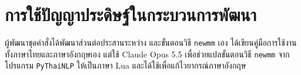 \chapter{การใช้ปัญญาประดิษฐ์ในกระบวนการพัฒนา}

ผู้พัฒนาชุดคำสั่งได้พัฒนาส่วนต่อประสานระหว่าง \lualatexlogo และขั้นตอนวิธี
\texttt{newmm} เอง ได้เขียนคู่มือการใช้งานทั้งภาษาไทยและภาษาอังกฤษเอง แต่ใช้
Claude Opus 5.5 เพื่อช่วยแปลขั้นตอนวิธี \texttt{newmm} จากโปรแกรม
\texttt{PyThaiNLP} ให้เป็นภาษา Lua และได้ใช้เพื่อแก้ไวยากรณ์ภาษาอังกฤษ

